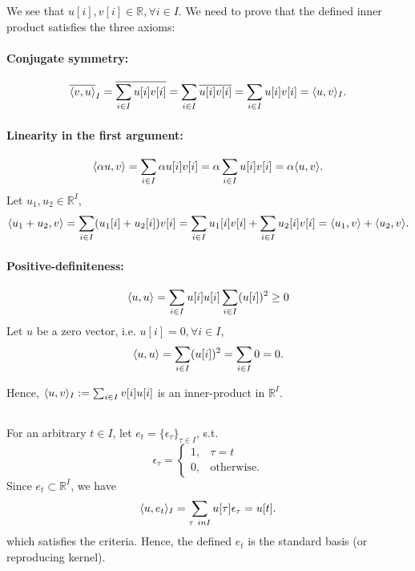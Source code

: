\subsection{}\label{subsec:p4-c}


\subsection{}\label{subsec:p4-d}


\subsection{}\label{subsec:p4-e}
We see that $u[i], v[i] \in \mathbb{R}, \forall i \in I$. We need to prove that the defined inner product satisfies the three axioms:

\paragraph{Conjugate symmetry:}
\[\overline{\langle v, u \rangle}_I = \overline{\sum_{i \in I} u[i]v[i]} = \sum_{i \in I} \overline{u[i]v[i]} = \sum_{i \in I} u[i]v[i] = \langle u, v \rangle_I.\]

\paragraph{Linearity in the first argument:}
\[\langle \alpha u, v \rangle = \sum_{i \in I} \alpha u[i]v[i] = \alpha \sum_{i \in I} u[i]v[i] = \alpha \langle u, v \rangle.\]
Let $u_1, u_2 \in \mathbb{R}^I$,
\[\langle u_1+u_2, v \rangle = \sum_{i \in I} (u_1[i]+u_2[i])v[i] = \sum_{i \in I} u_1[i]v[i] + \sum_{i \in I} u_2[i]v[i] = \langle u_1, v \rangle + \langle u_2, v \rangle.\]

\paragraph{Positive-definiteness:}
\[\langle u, u \rangle = \sum_{i \in I} u[i]u[i] \sum_{i \in I} (u[i])^2 \geq 0\]
Let $u$ be a zero vector, i.e. $u[i] = 0, \forall i \in I$,
\[\langle u, u \rangle = \sum_{i \in I} (u[i])^2 = \sum_{i \in I} 0 = 0.\]

Hence, $\langle u, v \rangle_I := \sum_{i \in I} v[i]u[i]$ is an inner-product in $\mathbb{R}^I$.

\subsection{}\label{subsec:p4-f}
For an arbitrary $t \in I$, let $e_t = \{\epsilon_\tau\}_{\tau \in I}$, s.t.
\[
\epsilon_\tau = \begin{cases}
1, &\tau = t\\
0, &\text{otherwise}.
\end{cases}
\]
Since $e_t \subset \mathbb{R}^I$, we have
\[\innerprod{u}{e_t}_I = \sum_{\tau \ in I} u[\tau] \epsilon_\tau = u[t].\]
which satisfies the criteria. Hence, the defined $e_t$ is the standard basis (or reproducing kernel).